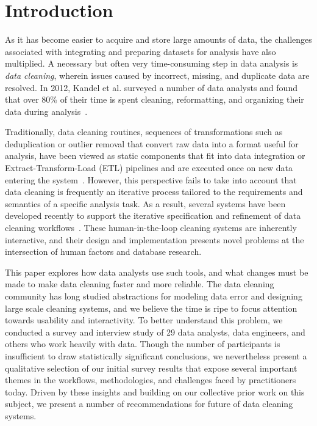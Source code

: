 \section{Introduction}
As it has become easier to acquire and store large amounts of data, the challenges associated with integrating and preparing datasets for analysis have also multiplied.
A necessary but often very time-consuming step in data analysis is \textit{data cleaning}, wherein issues caused by incorrect, missing, and duplicate data are resolved.
In 2012, Kandel et al. surveyed a number of data analysts and found that over 80\% of their time is spent cleaning, reformatting, and organizing their data during analysis~\cite{kandel2012}.

Traditionally, data cleaning routines, sequences of transformations such as deduplication or outlier removal that convert raw data into a format useful for analysis, have been viewed as static components that fit into data integration or Extract-Transform-Load (ETL) pipelines and are executed once on new data entering the system~\cite{apachefalcon, informatica, talend, nadeef}.
However, this perspective fails to take into account that data cleaning is frequently an iterative process tailored to the requirements and semantics of a specific analysis task.
As a result, several systems have been developed recently to support the iterative specification and refinement of data cleaning workflows~\cite{trifacta, 2011-wrangler, openrefine, wisteria}.
These human-in-the-loop cleaning systems are inherently interactive, and their design and implementation presents novel problems at the intersection of human factors and database research.




This paper explores how data analysts use such tools, and what changes must be made to make data cleaning faster and more reliable.
The data cleaning community has long studied abstractions for modeling data error and designing large scale cleaning systems, and we believe the time is ripe to focus attention towards usability and interactivity.
To better understand this problem, we conducted a survey and interview study of 29 data analysts, data engineers, and others who work heavily with data.
Though the number of participants is insufficient to draw statistically significant conclusions, we nevertheless present a qualitative selection of our initial survey results that expose several important themes in the workflows, methodologies, and challenges faced by practitioners today.
Driven by these insights and building on our collective prior work on this subject, we present a number of recommendations for future of data cleaning systems.

